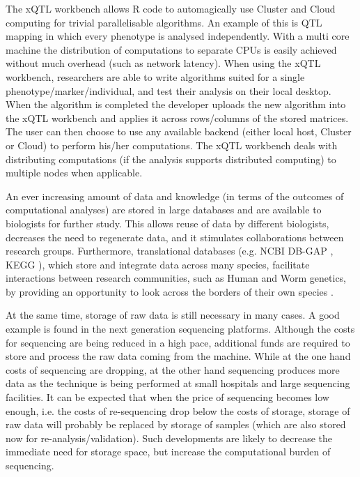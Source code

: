 The xQTL workbench allows R code to automagically use Cluster and Cloud computing for trivial parallelisable algorithms. An example of this is QTL mapping 
in which every phenotype is analysed independently. With a multi core machine the distribution of computations to separate CPUs is easily achieved without 
much overhead (such as network latency). When using the xQTL workbench, researchers are able to write algorithms suited for a single 
phenotype/marker/individual, and test their analysis on their local desktop. When the algorithm is completed the developer uploads the new algorithm into 
the xQTL workbench and applies it across rows/columns of the stored matrices. The user can then choose to use any available backend (either local host, 
Cluster or Cloud) to perform his/her computations. The xQTL workbench deals with distributing computations (if the analysis supports distributed computing) 
to multiple nodes when applicable. 

An ever increasing amount of data and knowledge (in terms of the outcomes of computational analyses) are stored in large databases and are available to 
biologists for further study. This allows reuse of data by different biologists, decreases the need to regenerate data, and it stimulates collaborations 
between research groups. Furthermore, translational databases (e.g. NCBI DB-GAP \cite{Mailman:2007}, KEGG \cite{Goto:2000}), which store and integrate 
data across many species, facilitate interactions between research communities, such as Human and Worm genetics, by providing an opportunity to look 
across the borders of their own species \cite{vanDerVelde:2014}. 

At the same time, storage of raw data is still necessary in many cases. A good example is found in the next generation sequencing platforms. Although the 
costs for sequencing are being reduced in a high pace, additional funds are required to store and process the raw data coming from the machine. While at 
the one hand costs of sequencing are dropping, at the other hand sequencing produces more data as the technique is being performed at small hospitals and 
large sequencing facilities. It can be expected that when the price of sequencing becomes low enough, i.e. the costs of re-sequencing drop below the 
costs of storage, storage of raw data will probably be replaced by storage of samples (which are also stored now for re-analysis/validation). Such 
developments are likely to decrease the immediate need for storage space, but increase the computational burden of sequencing.

